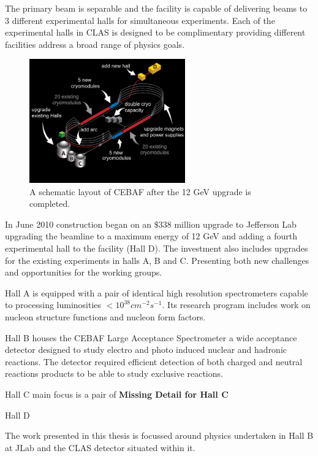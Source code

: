 The primary beam is separable and the facility is capable of delivering beams to 3 different experimental halls for simultaneous experiments. Each of the experimental halls in CLAS is designed to be complimentary providing different facilities address a broad range of physics goals.

\begin{figure}
	\centering
	\includegraphics[width=0.6\textwidth]{ImgChap1/CEBAF}
	\caption{A schematic layout of CEBAF after the 12 GeV upgrade is completed.}
	\label{CEBAF12}
\end{figure}

In June 2010 construction began on an $\$338$ million upgrade to Jefferson Lab upgrading the beamline to a maximum energy of 12 GeV and adding a fourth experimental hall to the facility (Hall D). The investment also includes upgrades for the existing experiments in halls A, B and C. Presenting both new challenges and opportunities for the working groups. 

Hall A is equipped with a pair of identical high resolution spectrometers capable to processing luminosities $< 10^{38} cm^{-2}s^{-1}$. Its research program includes work on nucleon structure functions and nucleon form factors. \cite{alcorn2004basic}

Hall B houses the CEBAF Large Acceptance Spectrometer a wide acceptance detector designed to study electro and photo induced nuclear and hadronic reactions. The detector required efficient detection of both charged and neutral reactions products to be able to study exclusive reactions. \cite{mecking2003cebaf}

Hall C main focus is a pair of \textbf{Missing Detail for Hall C}

Hall D \cite{qiang2015detector}


The work presented in this thesis is focussed around physics undertaken in Hall B at JLab and the CLAS detector situated within it.

